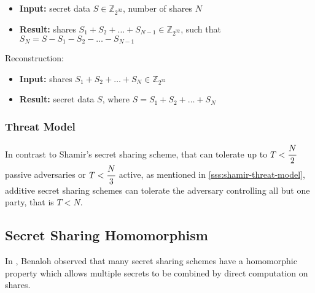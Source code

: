 \begin{itemize}
  \item \textbf{Input:} secret data $S \in \mathbb{Z}_{2^{32}}$, number of shares $N$
  \item \textbf{Result:} shares $S_1 + S_2 + \dots + S_{N-1} \in \mathbb{Z}_{2^{32}}$, such that $S_N = S - S_1 - S_2 - \dots - S_{N-1}$
\end{itemize}

Reconstruction:
\begin{itemize}
  \item \textbf{Input:} shares $S_1 + S_2 + \dots + S_{N} \in \mathbb{Z}_{2^{32}}$
  \item \textbf{Result:} secret data $S$, where $S = S_1 + S_2 + \dots + S_{N}$
\end{itemize}

\subsubsection{Threat Model}\label{sss:additive-threat-model}
In contrast to Shamir's secret sharing scheme, that can tolerate up to $T < \cfrac{N}{2}$ passive adversaries or $T < \cfrac{N}{3}$ active, as mentioned in \ref{sss:shamir-threat-model}, additive secret sharing schemes can tolerate the adversary controlling all but one party, that is $T < N$.



\subsection{Secret Sharing Homomorphism}\label{ss:secret-sharing-homomorphism}
In \cite{benaloh1986secret}, Benaloh observed that many secret sharing schemes have a homomorphic property which allows multiple secrets to be combined by direct computation on shares.



